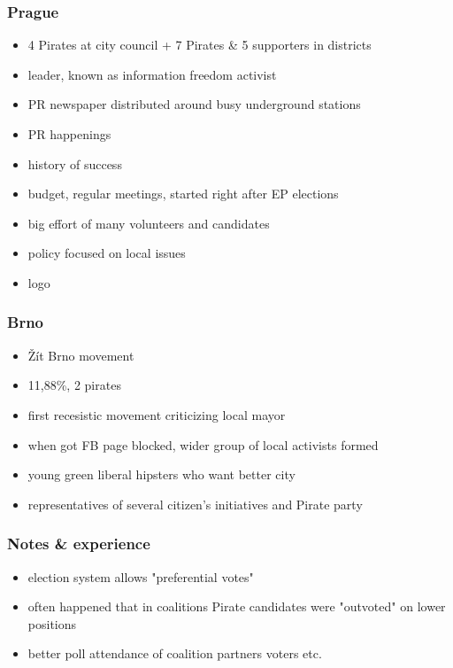 \begin{frame}
	\frametitle{Prague}
	\begin{itemize}
		\item 4 Pirates at city council + 7 Pirates \& 5 supporters in districts
		\item leader, known as information freedom activist
		\item PR newspaper distributed around busy underground stations
		\item PR happenings
		\item history of success
		\item budget, regular meetings, started right after EP elections
		\item big effort of many volunteers and candidates
		\item policy focused on local issues
		\item logo %
	\end{itemize}
\end{frame}
\begin{frame}
	\frametitle{Brno}
	\begin{itemize}
		\item \v{Z}\'it Brno movement
		\item 11,88\%, 2 pirates
		\item first recesistic movement criticizing local mayor
		\item when got FB page blocked, wider group of local activists formed
		\item young green liberal hipsters who want better city
		\item representatives of several citizen's initiatives and Pirate party
	\end{itemize}
\end{frame}
\begin{frame}
	\frametitle{Notes \& experience}
	\begin{itemize}
		\item election system allows "preferential votes"
		\item often happened that in coalitions Pirate candidates were "outvoted" on lower positions
		\item better poll attendance of coalition partners voters etc.
	\end{itemize}
\end{frame}
